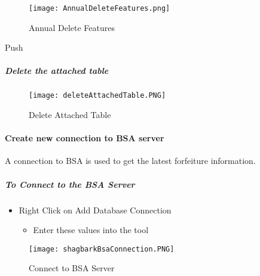   \vspace{.1in}

  \begin{figure}[h!]
  \centering
      \texttt{[image: AnnualDeleteFeatures.png]}
  \caption{Annual Delete Features}
  \end{figure}
  \vspace{.15in}

 {\bigbtn Push }


 \subparagraph{Delete the attached table}
  \begin{figure}[h!]
  \centering
      \texttt{[image: deleteAttachedTable.PNG]}
  \caption{Delete Attached Table}
  \end{figure}

  \clearpage






















 \paragraph{Create new connection to BSA server}

  A connection to BSA is used to get the latest forfeiture information.

 \subparagraph{To Connect to the BSA Server}

  \begin{itemize}
  \item {\Large Right Click on Add Database Connection}

  \begin{itemize}
  \item {\Large Enter these values into the tool}
  \end{itemize}
  \end{itemize}

  \vspace{.1in}



 \begin{figure}[h!]
  \centering
      \texttt{[image: shagbarkBsaConnection.PNG]}
  \caption{Connect to BSA Server}
  \end{figure}

